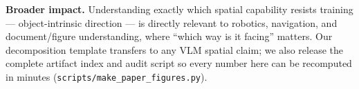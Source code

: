 \textbf{Broader impact.} Understanding exactly which spatial capability resists
training --- object-intrinsic direction --- is directly relevant to robotics,
navigation, and document/figure understanding, where ``which way is it facing''
matters. Our decomposition template transfers to any VLM spatial claim; we also
release the complete artifact index and audit script so every number here can be
recomputed in minutes (\texttt{scripts/make\_paper\_figures.py}).
